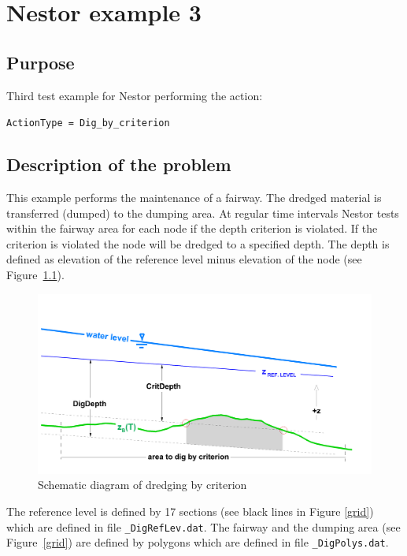 \chapter{Nestor example 3}
%

%
\section{Purpose}
%
Third test example for Nestor performing the action:

\texttt{ActionType = Dig\_by\_criterion}
%
\section{Description of the problem}
%
This example performs the maintenance of a fairway. The dredged material is transferred (dumped) to the dumping area.
At regular time intervals Nestor tests within the fairway area for each node if the depth criterion is violated. If the criterion is violated the node will be dredged to a specified depth.
The depth is defined as elevation of the reference level minus elevation of the node (see Figure~\ref{schema}).

\begin{figure} [!h]
	\centering
	\includegraphics[scale=0.12]{critDig_schematicDiagram.png}
	\caption{Schematic diagram of dredging by criterion}\label{schema}
\end{figure}

The reference level is defined by 17 sections (see black lines in Figure \ref{grid}) which are defined in file \texttt{\_DigRefLev.dat}.
The fairway and the dumping area (see Figure~\ref{grid}) are defined by polygons which are defined in file \texttt{\_DigPolys.dat}.


